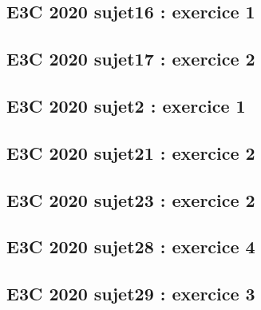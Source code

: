 \documentclass[lang=fr,edition=teacher,layout=sheet]{mxbook}
\begin{document}
\begingroup\endgroup
\par\bigskip
{}\subsection*{E3C 2020 sujet16 : exercice 1}
\begingroup\endgroup
\par\bigskip
{}\subsection*{E3C 2020 sujet17 : exercice 2}
\begingroup\endgroup
\par\bigskip
{}\subsection*{E3C 2020 sujet2 : exercice 1}
\begingroup\endgroup
\par\bigskip
{}\subsection*{E3C 2020 sujet21 : exercice 2}
\begingroup\endgroup
\par\bigskip
{}\subsection*{E3C 2020 sujet23 : exercice 2}
\begingroup\endgroup
\par\bigskip
{}\subsection*{E3C 2020 sujet28 : exercice 4}
\begingroup\endgroup
\par\bigskip
{}\subsection*{E3C 2020 sujet29 : exercice 3}
\begingroup\endgroup
\end{document}
